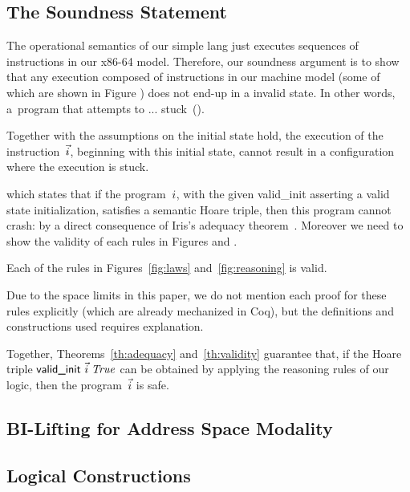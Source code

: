 \subsection{The Soundness Statement}
\label{def:soundness:statement}
The operational semantics of our simple lang just executes sequences of instructions in our x86-64 model. Therefore, our soundness argument is to show that any execution composed of instructions in our machine model (some of which are shown in Figure ) does not end-up in a invalid state. In other words, a~program that attempts to ... stuck~().
\begin{theorem}
  \label{th:adequacy}
 Together with the assumptions on the initial state hold,
 the execution of the instruction~$\vec{i}$, beginning with this initial state, cannot result in a configuration where the execution is stuck.
\end{theorem}
which states that if the program~$i$, with the given \textsf{valid\_init} asserting a valid state initialization, satisfies a semantic Hoare
triple, then this program cannot crash: by a direct consequence of Iris's adequacy theorem~\cite[\S6.4]{iris}.
Moreover we need to show the validity of each rules in Figures  and .
\begin{theorem}
\label{th:validity}
  Each of the rules in Figures~\ref{fig:laws}
  and~\ref{fig:reasoning} is valid.
\end{theorem}
Due to the space limits in this paper, we do not mention each proof for these rules explicitly (which are already mechanized in Coq),
but the definitions and constructions used requires explanation.

Together, Theorems~\ref{th:adequacy} and~\ref{th:validity} guarantee that, if
the Hoare triple $\textsf{valid\_init }\vec{i}\;\mathit{True}$ can be obtained by applying
the reasoning rules of our logic, then the program~$\vec{i}$ is safe.
\subsection{BI-Lifting for Address Space Modality}
\label{sec:bilifting}

\subsection{Logical Constructions}
\label{sec:invariant}

